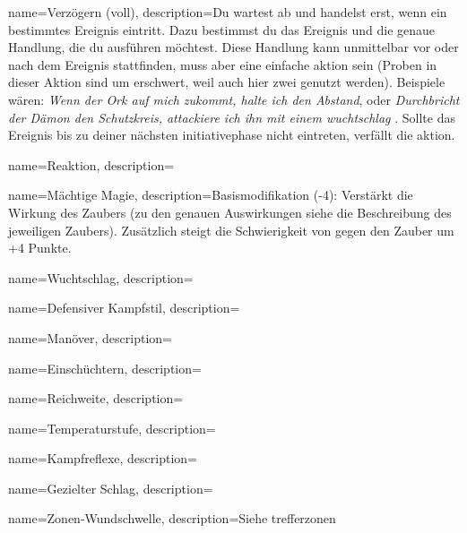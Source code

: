 {
    name={Verzögern (voll)},
    description={Du wartest ab und handelst erst, wenn ein bestimmtes Ereignis eintritt. Dazu bestimmst du das Ereignis und die genaue Handlung, die du ausführen möchtest. Diese Handlung kann unmittelbar vor oder nach dem Ereignis stattfinden, muss aber eine einfache \gls{aktion} sein (Proben in dieser Aktion sind um  erschwert, weil auch hier zwei  genutzt werden). Beispiele wären: \textit{Wenn der Ork auf mich zukommt, halte ich den Abstand}, oder \textit{Durchbricht der Dämon den Schutzkreis, attackiere ich ihn mit einem \gls{wuchtschlag} }. Sollte das Ereignis bis zu deiner nächsten \gls{initiativephase} nicht eintreten, verfällt die \gls{aktion}.}}

{
    name={Reaktion},
    description={}}


{
    name={Mächtige Magie},
    description={Basismodifikation (-4): Verstärkt die Wirkung des Zaubers (zu den genauen Auswirkungen siehe die Beschreibung des jeweiligen Zaubers). Zusätzlich steigt die Schwierigkeit von  gegen den Zauber um +4 Punkte.}}
    
    

{
    name={Wuchtschlag},
    description={}}

{
    name={Defensiver Kampfstil},
    description={}}

{
    name={Manöver},
    description={}}

{
    name={Einschüchtern},
    description={}}

{
    name={Reichweite},
    description={}}

{
    name={Temperaturstufe},
    description={}}

{
    name={Kampfreflexe},
    description={}}

{
    name={Gezielter Schlag},
    description={}}

{
    name={Zonen-Wundschwelle},
    description={Siehe \gls{trefferzonen}}}
        
        
        
        
        
